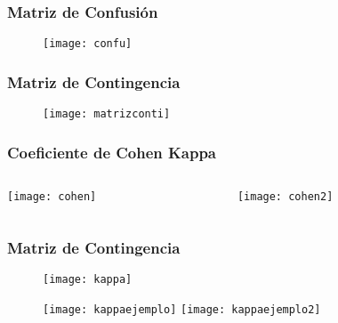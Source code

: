 \documentclass[14pt]{beamer}
\begin{document}
\begin{frame}
\frametitle{Matriz de Confusión}
  \begin{figure}
    \centering
    \texttt{[image: confu]}
  \end{figure}
\end{frame}
\begin{frame}
\frametitle{Matriz de Contingencia}
  \begin{figure}
    \centering
    \texttt{[image: matrizconti]}
  \end{figure}
\end{frame}
\begin{frame}
\frametitle{Coeficiente de Cohen Kappa}
\begin{columns}
		\begin{column}{.49\linewidth}
		 \texttt{[image: cohen]}
		\end{column}
		\begin{column}{.49\linewidth}
			 \texttt{[image: cohen2]}
		\end{column}
	\end{columns}
\end{frame}
\begin{frame}
\frametitle{Matriz de Contingencia}
  \begin{figure}
    \centering
    \texttt{[image: kappa]}
  \end{figure}
\tiny{}
\end{frame}
\begin{frame}
  \begin{figure}
    \centering
    \texttt{[image: kappaejemplo]}
  \texttt{[image: kappaejemplo2]}
  \end{figure}
\tiny{}
\end{frame}
\end{document}
